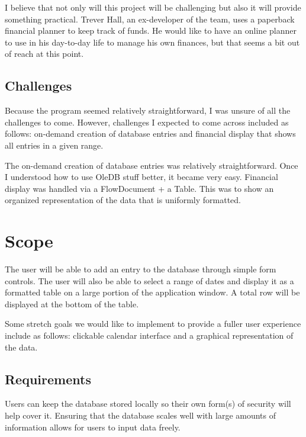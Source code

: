 \documentclass[10pt,conference,onecolumn,compsoc]{IEEEtran}
\begin{document}
I believe that not only will this project will be challenging but also it will provide something practical. Trever Hall, an ex-developer of the team, uses a paperback financial planner to keep track of funds. He would like to have an online planner to use in his day-to-day life to manage his own finances, but that seems a bit out of reach at this point.


\subsection{Challenges}
Because the program seemed relatively straightforward, I was unsure of all the challenges to come. However, challenges I expected to come across included as follows: on-demand creation of database entries and financial display that shows all entries in a given range.

The on-demand creation of database entries was relatively straightforward. Once I understood how to use OleDB stuff better, it became very easy.
Financial display was handled via a FlowDocument + a Table. This was to show an organized representation of the data that is uniformly formatted.


\section{Scope}
The user will be able to add an entry to the database through simple form controls. The user will also be able to select a range of dates and display it as a formatted table on a large portion of the application window. A total row will be displayed at the bottom of the table.

Some stretch goals we would like to implement to provide a fuller user experience include as follows: clickable calendar interface and a graphical representation of the data.



\subsection{Requirements}
Users can keep the database stored locally so their own form(s) of security will help cover it. Ensuring that the database scales well with large amounts of information allows for users to input data freely.
\end{document}
